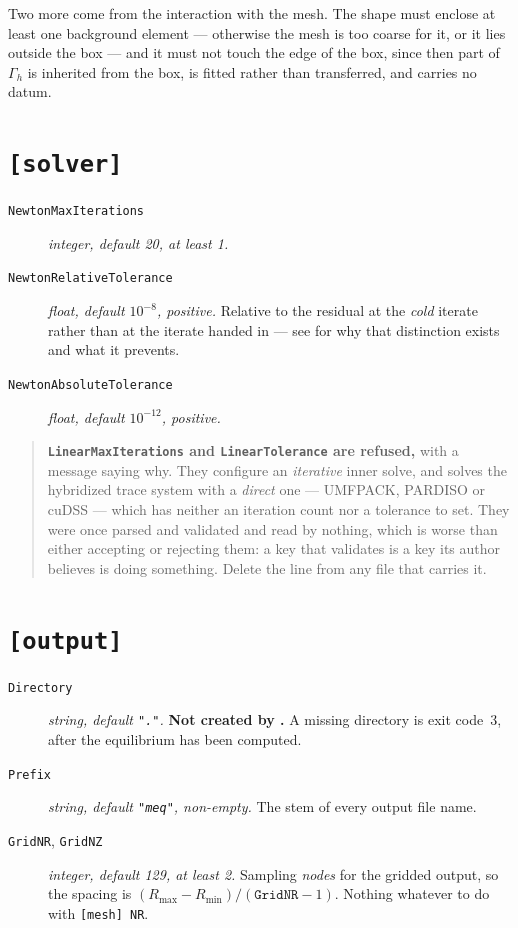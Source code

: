 Two more come from the interaction with the mesh. The shape must enclose at
least one background element --- otherwise the mesh is too coarse for it, or it
lies outside the box --- and it must not touch the edge of the box, since then
part of $\Gamma_h$ is inherited from the box, is fitted rather than transferred,
and carries no datum.

\section{\texttt{[solver]}}

\begin{description}
\item[\texttt{NewtonMaxIterations}] \emph{integer, default 20, at least 1.}
\item[\texttt{NewtonRelativeTolerance}] \emph{float, default $10^{-8}$,
	positive.} Relative to the residual at the \emph{cold} iterate rather than
	at the iterate handed in --- see  for why that
	distinction exists and what it prevents.
\item[\texttt{NewtonAbsoluteTolerance}] \emph{float, default $10^{-12}$,
	positive.}
\end{description}

\begin{quote}
	\textbf{\texttt{LinearMaxIterations} and \texttt{LinearTolerance} are
	refused,} with a message saying why. They configure an \emph{iterative}
	inner solve, and {\meq} solves the hybridized trace system with a
	\emph{direct} one --- UMFPACK, PARDISO or cuDSS --- which has neither an
	iteration count nor a tolerance to set. They were once parsed and validated
	and read by nothing, which is worse than either accepting or rejecting them:
	a key that validates is a key its author believes is doing something. Delete
	the line from any file that carries it.
\end{quote}

\section{\texttt{[output]}}

\begin{description}

\item[\texttt{Directory}] \emph{string, default \texttt{"."}.} \textbf{Not
	created by {\meq}.} A missing directory is exit code~3, after the
	equilibrium has been computed.

\item[\texttt{Prefix}] \emph{string, default \texttt{"meq"}, non-empty.} The
	stem of every output file name.

\item[\texttt{GridNR}, \texttt{GridNZ}] \emph{integer, default 129, at least 2.}
	Sampling \emph{nodes} for the gridded output, so the spacing is
	$(R_{\max} - R_{\min})/(\texttt{GridNR} - 1)$. Nothing whatever to do with
	\texttt{[mesh] NR}.

\end{description}


